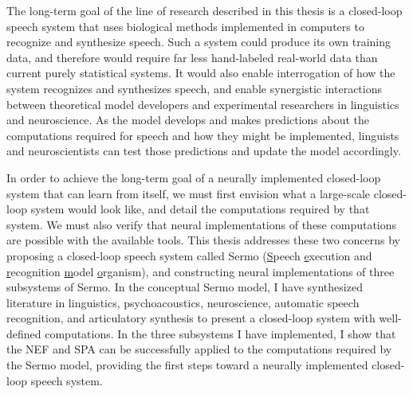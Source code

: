 The long-term goal of the line of research
described in this thesis
is a closed-loop speech system
that uses biological methods
implemented in computers
to recognize and synthesize speech.
Such a system could produce its own training data,
and therefore would require
far less hand-labeled real-world data than
current purely statistical systems.
It would also enable interrogation
of how the system recognizes
and synthesizes speech,
and enable synergistic interactions
between theoretical model developers
and experimental researchers
in linguistics and neuroscience.
As the model develops and makes predictions
about the computations required for speech
and how they might be implemented,
linguists and neuroscientists
can test those predictions
and update the model accordingly.

In order to achieve the long-term goal
of a neurally implemented closed-loop system
that can learn from itself,
we must first
envision what a large-scale closed-loop system
would look like,
and detail the computations required by that system.
We must also verify that neural implementations
of these computations
are possible with the available tools.
This thesis addresses these two concerns
by proposing a closed-loop speech system
called Sermo
(\underline{S}peech \underline{e}xecution and
\underline{r}ecognition \underline{m}odel \underline{o}rganism),
and constructing neural implementations
of three subsystems of Sermo.
In the conceptual Sermo model,
I have synthesized literature
in linguistics, psychoacoustics, neuroscience,
automatic speech recognition,
and articulatory synthesis
to present a closed-loop system
with well-defined computations.
In the three subsystems I have implemented,
I show that the NEF and SPA
can be successfully applied to
the computations required by the Sermo model,
providing the first steps
toward a neurally implemented closed-loop speech system.

